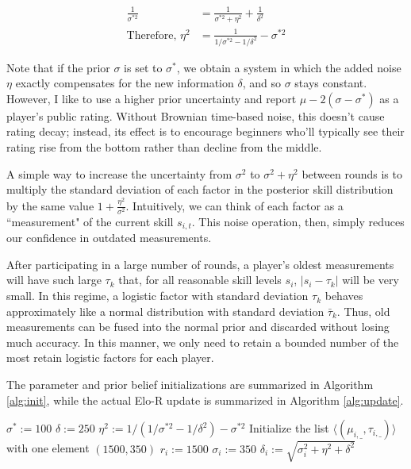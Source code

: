 \documentclass{article}
\begin{document}
\begin{align}
\frac{1}{\sigma^{*2}} &= \frac{1}{\sigma^{*2} + \eta^2} + \frac{1}{\delta^2}
\\ \text{Therefore, }\eta^2 &= \frac{1}{1/\sigma^{*2} - 1/\delta^2} - \sigma^{*2}
\end{align}

Note that if the prior $\sigma$ is set to $\sigma^*$, we obtain a system in which the added noise $\eta$ exactly compensates for the new information $\delta$, and so $\sigma$ stays constant. However, I like to use a higher prior uncertainty and report $\mu-2(\sigma-\sigma^*)$ as a player's public rating. Without Brownian time-based noise, this doesn't cause rating decay; instead, its effect is to encourage beginners who'll typically see their rating rise from the bottom rather than decline from the middle.

A simple way to increase the uncertainty from $\sigma^2$ to $\sigma^2 + \eta^2$ between rounds is to multiply the standard deviation of each factor in the posterior skill distribution by the same value $1 + \frac{\eta^2}{\sigma^2}$. Intuitively, we can think of each factor as a ``measurement" of the current skill $s_{i,t}$. This noise operation, then, simply reduces our confidence in outdated measurements.

After participating in a large number of rounds, a player's oldest measurements will have such large $\tau_k$ that, for all reasonable skill levels $s_i$, $|s_i-\tau_k|$ will be very small. In this regime, a logistic factor with standard deviation $\tau_k$ behaves approximately like a normal distribution with standard deviation $\bar\tau_k$. Thus, old measurements can be fused into the normal prior and discarded without losing much accuracy. In this manner, we only need to retain a bounded number of the most retain logistic factors for each player.

The parameter and prior belief initializations are summarized in Algorithm \ref{alg:init}, while the actual Elo-R update is summarized in Algorithm \ref{alg:update}.

\begin{algorithm}
\caption{$init()$}
\label{alg:init}
\begin{algorithmic}
\STATE $\sigma^* := 100$
\STATE $\delta := 250$
\STATE $\eta^2 := 1 / \left( 1/\sigma^{*2} - 1/\delta^2 \right) - \sigma^{*2}$
\STATE Initialize the list $\langle( \mu_{i,\_},\tau_{i,\_} )\rangle$ with one element $(1500, 350)$
\STATE $r_i := 1500$
\STATE $\sigma_i := 350$
\STATE $\delta_i := \sqrt{\sigma_i^2 + \eta^2 + \delta^2}$
\ENDFOR
\end{algorithmic}
\end{algorithm}
\end{document}
